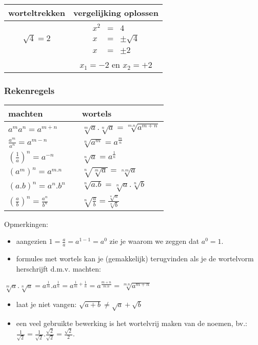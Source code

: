 \begin{table}
\centering
\begin{tabular}{|c||c|}
\hline 
worteltrekken & vergelijking oplossen\tabularnewline
\hline 
\hline 
${\displaystyle \sqrt{4}=2}$ & ${\displaystyle \begin{array}{lll}
x^{2} & = & 4\\
x & = & \pm\sqrt{4}\\
x & = & \pm2
\end{array}}$\tabularnewline
\hline 
 &  ${\displaystyle x_{1}=-2}$ en ${\displaystyle x_{2}=+2}$\tabularnewline
\hline 
\end{tabular}
\end{table}


\subsubsection{Rekenregels}

\begin{table}
	\centering
\begin{tabular}{|l|c|l|}
\hline 
machten &  & wortels\tabularnewline
\hline 
\hline 
${\displaystyle a^{m}a^{n}=a^{m+n}}$ &  & ${\displaystyle \sqrt[m]{a}.\sqrt[n]{a}=\sqrt[m.n]{a^{m+n}}}$\tabularnewline
\hline 
${\displaystyle \frac{a^{m}}{a^{n}}=a^{m-n}}$ &  & ${\displaystyle \sqrt[n]{a^{m}}=a^{\frac{m}{n}}}$\tabularnewline
\hline 
${\displaystyle \left(\frac{1}{a}\right)^{n}=a^{-n}}$ &  & ${\displaystyle \sqrt[n]{a}=a^{\frac{1}{n}}}$\tabularnewline
\hline 
${\displaystyle \left(a^{m}\right)^{n}=a^{m.n}}$ &  & ${\displaystyle \sqrt[n]{\sqrt[m]{a}}=\sqrt[n.m]{a}}$\tabularnewline
\hline 
${\displaystyle \left(a.b\right)^{n}=a^{n}.b^{n}}$ &  & ${\displaystyle \sqrt[n]{a.b}=\sqrt[n]{a}.\sqrt[n]{b}}$\tabularnewline
\hline 
${\displaystyle \left(\frac{a}{b}\right)^{n}=\frac{a^{n}}{b^{n}}}$ &  & ${\displaystyle \sqrt[n]{\frac{a}{b}}=\frac{\sqrt[n]{a}}{\sqrt[n]{b}}}$\tabularnewline
\hline 
\end{tabular}
\end{table}
\medskip{}


\noindent Opmerkingen:
\begin{itemize}
\item aangezien ${\displaystyle 1=\frac{a}{a}=a^{1-1}=a^{0}}$ zie je waarom
we zeggen dat ${\displaystyle a^{0}=1}$.
\item formules met wortels kan je (gemakkelijk) terugvinden als je de wortelvorm
herschrijft d.m.v. machten:
\end{itemize}
${\displaystyle \sqrt[m]{a}.\sqrt[n]{a}=a^{\frac{1}{m}}.a^{\frac{1}{n}}=a^{\frac{1}{m}+\frac{1}{n}}=a^{\frac{m+n}{m.n}}=\sqrt[m.n]{a^{m+n}}}$
\begin{itemize}
\item laat je niet vangen: ${\displaystyle \sqrt{a+b}\neq\sqrt{a}+\sqrt{b}}$
\item een veel gebruikte bewerking is het wortelvrij maken van de noemen,
bv.: ${\displaystyle \frac{1}{\sqrt{2}}=\frac{1}{\sqrt{2}}.\frac{\sqrt{2}}{\sqrt{2}}=\frac{\sqrt{2}}{2}.}$
\end{itemize}

